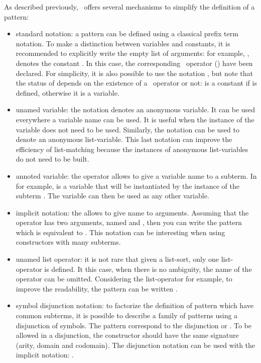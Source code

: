 As described previously, \TOM\ offers several mechanisms to simplify
the definition of a pattern:
\begin{itemize}
\item standard notation: a pattern can be defined using a classical
  prefix term notation.  
  To make a distinction between variables and constants, it is
  recommended to explicitly write the empty list of arguments:
  for example, , denotes the constant . In this case,
  the corresponding \TOM\ operator () have been declared.
  For simplicity, it is also possible to use the notation , but
  note that the status of  depends on the existence of a \TOM\
  operator or not:  is a constant if  is defined,
  otherwise it is a variable.

\item unamed variable: the \lex{\_} notation denotes an anonymous
  variable. It can be used everywhere a variable name can be used. It
  is useful when the instance of the variable does not need to be
  used.
  Similarly, the \lex{\_*} notation can be used to denote an anonymous
  list-variable. This last notation can improve the efficiency of
  list-matching because the instances of anonymous list-variables do not
  need to be built. 

\item annoted variable: the  operator allows to give a variable
  name to a subterm. In \lex{f(x@g(\_))} for example, \lex{x} is a
  variable that will be instantiated by the instance of the subterm
  \lex{g(\_)}. The variable
   can then be used as any other variable.

\item implicit notation: the  allows to give name to
  arguments. Assuming that the operator  has two arguments,
  named \lex{arg1} and \lex{arg2}, then you can write the pattern
  \lex{f[arg1=a()]} which is equivalent to \lex{f(a(),\_)}. This
  notation can be interesting when using constructors with many
  subterms. 

\item unamed list operator: it is not rare that given a list-sort,
  only one list-operator is defined. It this case, when there is no
  ambiguity, the name of the operator can be omitted.
  Considering the  list-operator for example, to improve the
  readability, the pattern \lex{conc(\_*,x,\_*)} can be written
  .

\item symbol disjunction notation: to factorize the definition of
  pattern which have common subterms, it is possible to describe a
  family of patterns using a disjunction of symbols.
  The pattern  correspond to the disjunction
   or . To be allowed in a disjunction, the
  constructor should have the same signature (arity, domain and
  codomain). The disjunction notation can be used with the implicit
  notation: \lex{(f|g)[arg1=a()]}.

\end{itemize}

